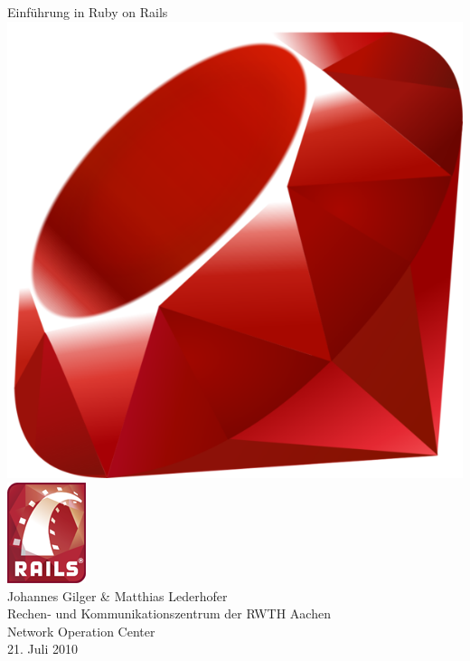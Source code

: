 \begin{frame}
  \begin{center}
    \vspace*{\fill}
    \Huge Einführung in Ruby on Rails \\
    \vspace{0.8cm}
    \includegraphics[scale=2]{img/ruby-logo.png} \enskip
    \includegraphics[scale=0.6]{img/rails-logo.png} \\
    \vspace{0.6cm}
    \Large Johannes Gilger \& Matthias Lederhofer \\
    \small Rechen- und Kommunikationszentrum der RWTH Aachen \\
    \small Network Operation Center \\
    \vspace{1cm}
    \small 21. Juli 2010
    \vspace*{\fill}
  \end{center}
\end{frame}

